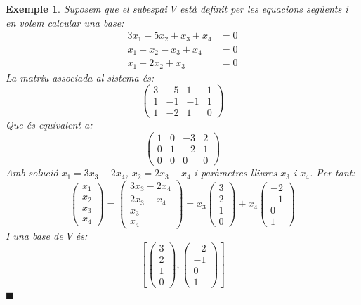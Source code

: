\documentclass[
  11pt,
]{book}
\numberwithin{dummy}{section}
\theoremstyle{maincolornumbox}
\theoremstyle{blacknumex}
\newtheorem{exampleT}{Exemple}[chapter]
\theoremstyle{blacknumbox}
\theoremstyle{maincolornum}
\newenvironment{example}{\begin{exampleT}}{\hfill{\tiny\ensuremath{\blacksquare}}\end{exampleT}}
\newlength\esp
\begin{document}
\begin{example}
Suposem que el subespai \(V\) està definit per les equacions següents i en
volem calcular una base: \begin{align*}
        3 x_1 -5x_2 +x_3 + x_4  & = 0 \\
        x_1 - x_2  - x_3 + x_4 & = 0 \\
        x_1-2x_2+x_3 & =0
\end{align*} La matriu associada al sistema és: \[\begin{pmatrix}
    3 & -5 & 1 & 1 \\ 1 & -1 & -1 & 1 \\ 1 & -2 & 1 & 0
    \end{pmatrix}\] Que és equivalent a: \[\begin{pmatrix}
    1 & 0 & -3 & 2 \\
    0 & 1 & -2 & 1 \\
    0 & 0 & 0 & 0
    \end{pmatrix}\] Amb solució \(x_1=3x_3-2x_4\), \(x_2=2x_3-x_4\) i
paràmetres lliures \(x_3\) i \(x_4\). Per tant:
\[\begin{pmatrix} x_1\\ x_2\\ x_3\\ x_4 \end{pmatrix}=
    \begin{pmatrix} 3x_3-2x_4\\ 2x_3-x_4\\ x_3\\ x_4 \end{pmatrix}=
    x_3 \begin{pmatrix} 3\\ 2\\ 1 \\ 0 \end{pmatrix}+
    x_4\begin{pmatrix}  -2 \\ -1 \\ 0\\ 1 \end{pmatrix}\] I una base de
\(V\) és: \[\left[\begin{pmatrix} 3\\ 2\\ 1 \\ 0 \end{pmatrix}, 
    \begin{pmatrix}  -2 \\ -1 \\ 0\\ 1 \end{pmatrix}\right]\]
\end{example}
\end{document}

